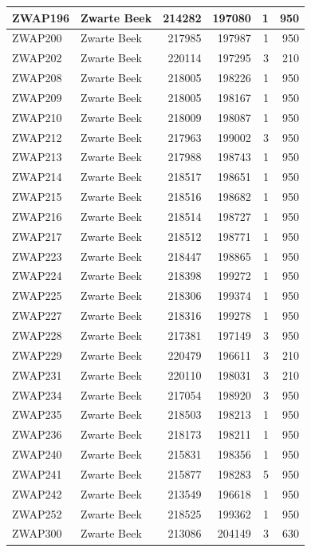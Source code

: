 \documentclass[11pt,]{book}
\begin{document}
\begin{table}
\begin{tabular}[t]{l|l|r|r|r|r}
\hline
ZWAP196 & Zwarte Beek & 214282 & 197080 & 1 & 950\\
\hline
ZWAP200 & Zwarte Beek & 217985 & 197987 & 1 & 950\\
\hline
ZWAP202 & Zwarte Beek & 220114 & 197295 & 3 & 210\\
\hline
ZWAP208 & Zwarte Beek & 218005 & 198226 & 1 & 950\\
\hline
ZWAP209 & Zwarte Beek & 218005 & 198167 & 1 & 950\\
\hline
ZWAP210 & Zwarte Beek & 218009 & 198087 & 1 & 950\\
\hline
ZWAP212 & Zwarte Beek & 217963 & 199002 & 3 & 950\\
\hline
ZWAP213 & Zwarte Beek & 217988 & 198743 & 1 & 950\\
\hline
ZWAP214 & Zwarte Beek & 218517 & 198651 & 1 & 950\\
\hline
ZWAP215 & Zwarte Beek & 218516 & 198682 & 1 & 950\\
\hline
ZWAP216 & Zwarte Beek & 218514 & 198727 & 1 & 950\\
\hline
ZWAP217 & Zwarte Beek & 218512 & 198771 & 1 & 950\\
\hline
ZWAP223 & Zwarte Beek & 218447 & 198865 & 1 & 950\\
\hline
ZWAP224 & Zwarte Beek & 218398 & 199272 & 1 & 950\\
\hline
ZWAP225 & Zwarte Beek & 218306 & 199374 & 1 & 950\\
\hline
ZWAP227 & Zwarte Beek & 218316 & 199278 & 1 & 950\\
\hline
ZWAP228 & Zwarte Beek & 217381 & 197149 & 3 & 950\\
\hline
ZWAP229 & Zwarte Beek & 220479 & 196611 & 3 & 210\\
\hline
ZWAP231 & Zwarte Beek & 220110 & 198031 & 3 & 210\\
\hline
ZWAP234 & Zwarte Beek & 217054 & 198920 & 3 & 950\\
\hline
ZWAP235 & Zwarte Beek & 218503 & 198213 & 1 & 950\\
\hline
ZWAP236 & Zwarte Beek & 218173 & 198211 & 1 & 950\\
\hline
ZWAP240 & Zwarte Beek & 215831 & 198356 & 1 & 950\\
\hline
ZWAP241 & Zwarte Beek & 215877 & 198283 & 5 & 950\\
\hline
ZWAP242 & Zwarte Beek & 213549 & 196618 & 1 & 950\\
\hline
ZWAP252 & Zwarte Beek & 218525 & 199362 & 1 & 950\\
\hline
ZWAP300 & Zwarte Beek & 213086 & 204149 & 3 & 630\\

\end{tabular}
\end{table}
\end{document}
